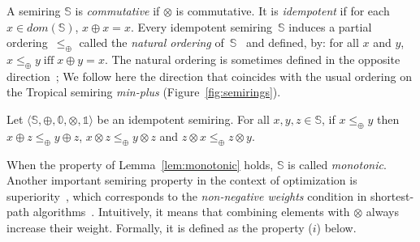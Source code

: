\documentclass[runningheads]{llncs}
\def\wrt{\textit{wrt}\xspace}
\def\<#1>{\langle #1 \rangle}
\newcommand{\Semiring}{\mathbb{S}}
\newcommand{\zero}{\mathbb{0}}
\newcommand{\one}{\mathbb{1}}
\newcommand{\dom}{\ensuremath{\mathit{dom}}}
\begin{document}
\medskip%
A semiring $\Semiring$ is \emph{commutative} if $\otimes$ is commutative.
It is \emph{idempotent} if for each $x \in \dom(\Semiring)$, $x \oplus x = x$.
%
Every idempotent semiring~$\Semiring$ induces 
a partial ordering~$\leq_\oplus$ 
called the \emph{natural ordering} of~$\Semiring$~\cite{Mohri02semiring} 
and defined,  by: 
for all $x$ and $y$,
$x \leq_\oplus y \;\mbox{iff}\; x \oplus y = x$.
%
The natural ordering is sometimes defined in the opposite direction~\cite{DrosteKuich09semirings};
We follow here the direction  %
that coincides with the usual ordering on the Tropical semiring \emph{min-plus} 
(Figure~\ref{fig:semirings}).

\begin{lemma} \label{lem:monotonic}
Let $\< \Semiring, \oplus, \zero, \otimes, \one>$ be an idempotent semiring.
For all $x, y, z  \in \Semiring$,  
if $x \leq_\oplus y$ then
$x \oplus z \leq_\oplus y \oplus z$,
$x \otimes z \leq_\oplus y \otimes z$
and $z \otimes x \leq_\oplus z \otimes y$.
\end{lemma}   
When the property of Lemma~\ref{lem:monotonic} holds, 
$\Semiring$ is called  \emph{monotonic}. %
%
Another important semiring property in the context of optimization
is {superiority}~\cite{Huang08advanceddynamic}, 
which corresponds to the 
\emph{non-negative weights} condition in shortest-path algorithms~\cite{Dijkstra59anote}.
Intuitively, it means that combining elements with $\otimes$ always increase their weight. 
Formally, it is defined as the property ($i$) below. %
\end{document}
